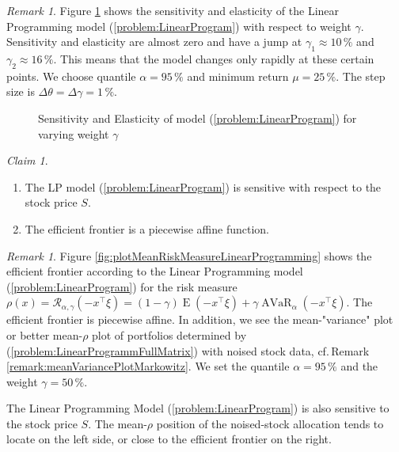 \documentclass[a4paper, english, 11pt, onecolumn, oneside, final]{article}
\numberwithin{equation}{section}   %
\DeclareMathOperator{\E}{\mathrm{E}}	    %
\DeclareMathOperator{\AVaR}{\mathrm{AVaR}}	%
\theoremstyle{plain}
\theoremstyle{definition}
\theoremstyle{remark}
\newtheorem{remark}     [theorem]{Remark}
\newtheorem{claim}      [theorem]{Claim}
\begin{document}
\newpage
\begin{remark}
    Figure \ref{fig:plotSensitivityElasticityLinearProgrammingGamma} shows the sensitivity and elasticity of the Linear Programming model (\ref{problem:LinearProgram}) with respect to weight $\gamma$. Sensitivity and elasticity are almost zero and have a jump at $\gamma_1\approx10\,\%$ and $\gamma_2\approx16\,\%$. This means that the model changes only rapidly at these certain points. We choose quantile $\alpha=95\,\%$ and minimum return $\mu=25\,\%$. The step size is $\Delta\theta=\Delta\gamma=1\,\%$.
\end{remark}
\begin{figure}[h]
  \centering
  
  \caption{Sensitivity and Elasticity of model (\ref{problem:LinearProgram}) for varying weight $\gamma$}
  \label{fig:plotSensitivityElasticityLinearProgrammingGamma}
\end{figure}
\newpage
\begin{claim}\mbox{}
    \begin{enumerate}[\itshape(i)]
        \item The LP model (\ref{problem:LinearProgram}) is sensitive with respect to the stock price $S$.
        \item The efficient frontier is a piecewise affine function.
    \end{enumerate}
\end{claim}
\begin{remark}
    Figure \ref{fig:plotMeanRiskMeasureLinearProgramming} shows the efficient frontier according to the Linear Programming model (\ref{problem:LinearProgram}) for the risk measure $\rho(x)=\mathcal{R}_{\alpha,\gamma}(-x^\top\xi)=(1-\gamma)\E(-x^\top\xi)+\gamma\AVaR_\alpha(-x^\top\xi)$. The efficient frontier is piecewise affine. In addition, we see the mean-"variance" plot or better mean-$\rho$ plot of portfolios determined by (\ref{problem:LinearProgrammFullMatrix}) with noised stock data, cf.\,Remark \ref{remark:meanVariancePlotMarkowitz}. We set the quantile $\alpha=95\,\%$ and the weight $\gamma=50\,\%$. \medskip
    
    The Linear Programming Model (\ref{problem:LinearProgram}) is also sensitive to the stock price $S$. The mean-$\rho$ position of the noised-stock allocation tends to locate on the left side, or close to the efficient frontier on the right.
\end{remark}
\end{document}
